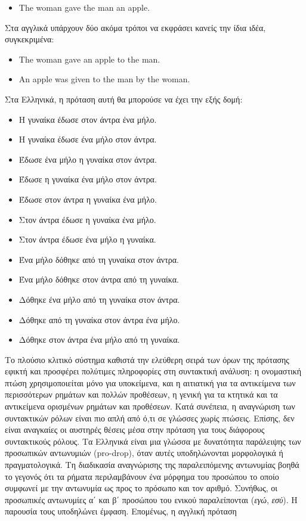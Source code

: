 \documentclass[]{../../metanetpaper}
\begin{document}
\begin{multicols}{2}
\begin{itemize}
\item[] The woman gave the man an apple.
\end{itemize}

Στα αγγλικά υπάρχουν δύο ακόμα τρόποι να εκφράσει κανείς την ίδια ιδέα, συγκεκριμένα:

\begin{itemize}
\item The woman gave an apple to the man.
\item An apple was given to the man by the woman.
\end{itemize}

Στα Ελληνικά, η πρόταση αυτή θα μπορούσε να έχει την εξής δομή:

\begin{itemize}    
\item Η γυναίκα έδωσε στον άντρα ένα μήλο.
\item Η γυναίκα έδωσε ένα μήλο στον άντρα.
\item Έδωσε ένα μήλο η γυναίκα στον άντρα.
\item Έδωσε η γυναίκα ένα μήλο στον άντρα.
\item Έδωσε στον άντρα η γυναίκα ένα μήλο.
\item Στον άντρα έδωσε η γυναίκα ένα μήλο.
\item Στον άντρα έδωσε ένα μήλο η γυναίκα.
\item Ένα μήλο δόθηκε από τη γυναίκα στον άντρα.
\item Ένα μήλο δόθηκε στον άντρα από τη γυναίκα.
\item Δόθηκε ένα μήλο από τη γυναίκα στον άντρα.
\item Δόθηκε από τη γυναίκα στον άντρα ένα μήλο.
\item Δόθηκε στον άντρα ένα μήλο από τη γυναίκα.
\end{itemize}

Το πλούσιο κλιτικό σύστημα καθιστά την ελεύθερη σειρά των όρων της πρότασης εφικτή και προσφέρει πολύτιμες πληροφορίες στη συντακτική ανάλυση: η ονομαστική πτώση χρησιμοποιείται μόνο για υποκείμενα, και η αιτιατική για τα αντικείμενα των περισσότερων ρημάτων και πολλών προθέσεων, η γενική για τα κτητικά και τα αντικείμενα ορισμένων ρημάτων και προθέσεων. Κατά συνέπεια, η αναγνώριση των συντακτικών ρόλων είναι πιο απλή από ό,τι σε γλώσσες χωρίς πτώσεις. Επίσης, δεν είναι αναγκαίες οι αυστηρές θέσεις μέσα στην πρόταση για τους διάφορους συντακτικούς ρόλους.  
Τα Ελληνικά είναι μια γλώσσα με δυνατότητα παράλειψης των προσωπικών αντωνυμιών (pro-drop), όταν αυτές υποδηλώνονται μορφολογικά ή πραγματολογικά. Τη διαδικασία αναγνώρισης της παραλειπόμενης αντωνυμίας βοηθά το γεγονός ότι τα ρήματα περιλαμβάνουν ένα μόρφημα του προσώπου το οποίο συμφωνεί με την αντωνυμία ως προς το πρόσωπο και τον αριθμό. Συνήθως, οι προσωπικές αντωνυμίες α΄ και β΄ προσώπου του ενικού παραλείπονται (\textit{εγώ}, \textit{εσύ}). Η παρουσία τους υποδηλώνει έμφαση. Επομένως, η αγγλική πρόταση


\end{multicols}
\end{document}
